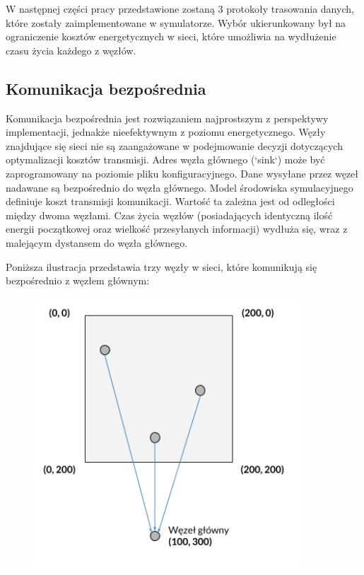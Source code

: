 \documentclass[a4paper,12pt,twoside,openany]{report}
\begin{document}
W następnej części pracy przedstawione zostaną 3 protokoły trasowania danych, które zostały zaimplementowane w symulatorze.
Wybór ukierunkowany był na ograniczenie kosztów energetycznych w sieci, które umożliwia na wydłużenie czasu życia każdego z węzłów.

\subsection{Komunikacja bezpośrednia}

Komunikacja bezpośrednia jest rozwiązaniem najprostszym z perspektywy implementacji, jednakże nieefektywnym z poziomu energetycznego. 
Węzły znajdujące się sieci nie są zaangażowane w podejmowanie decyzji dotyczących optymalizacji kosztów transmisji. 
Adres węzła głównego (`sink`) może być zaprogramowany na poziomie pliku konfiguracyjnego.
Dane wysyłane przez węzeł nadawane są bezpośrednio do węzła głównego.
Model środowiska symulacyjnego definiuje koszt transmisji komunikacji. Wartość ta zależna jest od odległości między dwoma węzłami.
Czas życia węzłów (posiadających identyczną ilość energii początkowej oraz wielkość przesyłanych informacji) wydłuża się, wraz z malejącym dystansem do węzła głównego.

Poniższa ilustracja przedstawia trzy węzły w sieci, które komunikują się bezpośrednio z węzłem głównym:

\begin{figure}[H]
 \centering
 \includegraphics[width=10cm]{images/komunikacja_bezposrednia.png}
\end{figure}
\end{document}
